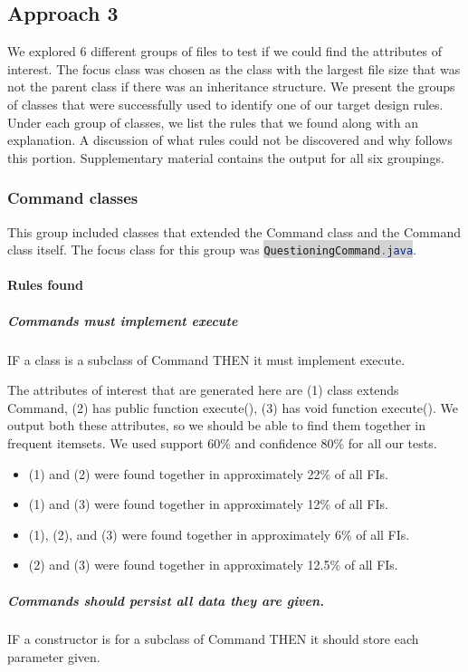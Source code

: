 \documentclass[12pt]{article}
\newcommand{\inlinecode}[2]{\colorbox{lightgray}{\lstinline[language=#1]$#2$}}
\begin{document}
	\subsection{Approach 3}
	
	We explored 6 different groups of files to test if we could find the attributes of interest. The focus class was chosen as the class with the largest file size that was not the parent class if there was an inheritance structure. We present the groups of classes that were successfully used to identify one of our target design rules. Under each group of classes, we list the rules that we found along with an explanation. A discussion of what rules could not be discovered and why follows this portion. Supplementary material contains the output for all six groupings. 
	
	\subsubsection{Command classes}
		This group included classes that extended the Command class and the Command class itself. The focus class for this group was \inlinecode{Java}{QuestioningCommand.java}.
		
		\paragraph {Rules found}
			
			\subparagraph{Commands must implement execute} IF a class is a subclass of Command THEN it must implement execute.
			
			The attributes of interest that are generated here are (1) class extends Command, (2) has public function execute(), (3) has void function execute(). We output both these attributes, so we should be able to find them together in frequent itemsets. We used support 60\% and confidence 80\% for all our tests. 
		\begin{itemize}
			\item (1) and (2) were found together in approximately 22\% of all FIs.
			\item (1) and (3) were found together in approximately 12\% of all FIs.
			\item (1), (2), and (3) were found together in approximately 6\% of all FIs.				\item (2) and (3) were found together in approximately 12.5\% of all FIs. 
		\end{itemize}
		
			\subparagraph{Commands should persist all data they are given.} IF a constructor is for a subclass of Command THEN it should store each parameter given. 
			
\end{document}
